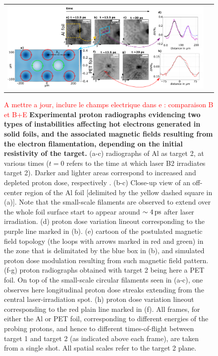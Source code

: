 \documentclass[aps,twocolumn,showpacs,superscriptaddress]{revtex4}
\begin{document}
\begin{figure}[tbh!]
\begin{tabular}{cc}
\includegraphics[scale = 0.6]{panel_v5.pdf}
\end{tabular}
 \caption{\label{fig:radio} 
\textcolor{red}{A mettre a jour, inclure le champs electrique dans e : comparaison B et B+E}
\textbf{Experimental proton radiographs evidencing two types of instabilities affecting hot electrons generated in solid foils, and the associated magnetic fields resulting from the electron filamentation, depending on the initial resistivity of the target.  }
(a-c) radiographs of Al as target 2, at various times ($t=0$ refers to the time at which laser B2 irradiates target 2). Darker and lighter areas correspond to increased and depleted proton dose, respectively \cite{RSI_Albertazzi_2015}. 
(b-c) Close-up view of an off-center region of the Al foil [delimited by the yellow dashed square in (a)]. 
Note that the small-scale filaments are observed to extend over the whole foil surface start to appear around $\sim 4\,\rm ps$ after laser irradiation.
(d) proton dose variation lineout corresponding to  the purple line  marked in (b). 
(e) cartoon of the postulated magnetic field topology (the loops with arrows marked in red and green) in the zone that is delimitated by the blue box in (b), and simulated proton dose modulation resulting from such magnetic field pattern. 
(f-g) proton radiographs obtained with target 2 being here a PET foil. On top of the small-scale circular filaments seen in (a-c), one observes here longitudinal proton dose streaks extending from the central laser-irradiation spot. 
(h) proton dose variation lineout corresponding to the red plain line marked in (f).
All frames, for either the Al or PET foil, corresponding to different energies of the probing protons, and hence to different times-of-flight between target 1 and target 2 (as indicated above each frame), are taken from a single shot. All spatial scales refer to the target 2 plane.
}
\end{figure}
\end{document}
